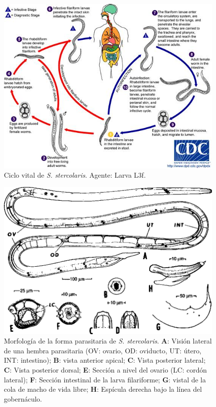 \begin{multicols}{2}
	\begin{figure}[H]
		\centering
		\includegraphics[width=0.9\columnwidth]{A.imagenes/ACV-BioSan-Parasit-SStercolarisCbios}
		\caption[Ciclo vital de \textit{S. stercolaris}]{Ciclo vital de \textit{S. stercolaris}. Agente: Larva L3f.\label{fig:PARASIT:SStercolarisCBios}}
	\end{figure}
	\begin{figure}[H]
		\centering
		\includegraphics[width=0.9\columnwidth]{A.imagenes/ACV-BioSan-Parasit-SStercolarisMorf}
		\caption[Morfología de la forma parásita de \textit{S. stercolaris}]{Morfología de la forma parasitaria de \textit{S. stercolaris}. \textbf{A}: Visión lateral de una hembra parasitaria (OV: ovario, OD: oviducto, UT: útero, INT: intestino); \textbf{B}: vista anterior apical; \textbf{C}: Vista posterior lateral; \textbf{C}: Vista posterior dorsal; \textbf{E}: Sección a nivel del ovario (LC: cordón lateral); \textbf{F}: Sección intestinal de la larva filariforme; \textbf{G}: vistal de la cola de macho de vida libre; \textbf{H}: Espícula derecha bajo la línea del gobernáculo.\label{fig:PARASIT:SStercolarisMorf}}
	\end{figure}
\end{multicols}

